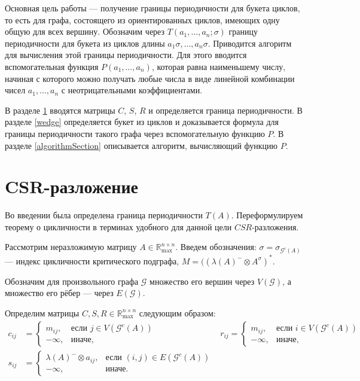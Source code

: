 \documentclass[12pt]{article}
\theoremstyle{definition}
\begin{document}
Основная цель работы --- получение границы периодичности для букета циклов, то есть для графа, состоящего из ориентированных циклов, имеющих одну общую для всех вершину. Обозначим через $T(a_1, \dots, a_n; \sigma)$ границу периодичности для букета из циклов длины $a_1\sigma, \dots, a_n\sigma$. Приводится алгоритм для вычисления этой границы периодичности. Для этого вводится вспомогательная функция $P(a_1, \dots, a_n)$, которая равна наименьшему числу, начиная с которого можно получать любые числа в виде линейной комбинации чисел $a_1, \dots, a_n$ с неотрицательными коэффициентами.

В разделе \ref{CSR} вводятся матрицы $C$, $S$, $R$ и определяется граница периодичности. В разделе \ref{wedge} определяется букет из циклов и доказывается формула для границы периодичности такого графа через вспомогательную функцию $P$. В разделе \ref{algorithmSection} описывается алгоритм, вычисляющий функцию $P$.

\section{CSR-разложение}
\label{CSR}
Во введении была определена граница периодичности $T(A)$. Переформулируем теорему о цикличности в терминах удобного для данной цели $CSR$-разложения.

Рассмотрим неразложимую матрицу $A \in \mathbb{R}_{\max}^{n \times n}$. Введем обозначения: $\sigma = \sigma_{\mathcal{G}^c(A)}$ --- индекс цикличности критического подграфа, $M = ((\lambda(A)^-\otimes A^\sigma)^*$.

Обозначим для произвольного графа $\mathcal{G}$ множество его вершин через $V(\mathcal{G})$, а множество его рёбер --- через $E(\mathcal{G})$.

Определим матрицы $C, S, R \in \mathbb{R}_{\max}^{n \times n}$ следующим образом:
\begin{align*}
    c_{ij} &= \begin{cases}
        m_{ij}, &\text{если } j \in V(\mathcal{G}^c(A)) \\
        -\infty, &\text{иначе,}
    \end{cases}
    &
    r_{ij} = \begin{cases}
        m_{ij}, &\text{если } i \in V(\mathcal{G}^c(A)) \\
        -\infty, &\text{иначе,}
    \end{cases}
    \\
    s_{ij} &= \begin{cases}
        \lambda(A)^- \otimes a_{ij}, &\text{если } (i, j) \in E(\mathcal{G}^c(A)) \\
        -\infty, &\text{иначе.}
    \end{cases}
\end{align*}
\end{document}
